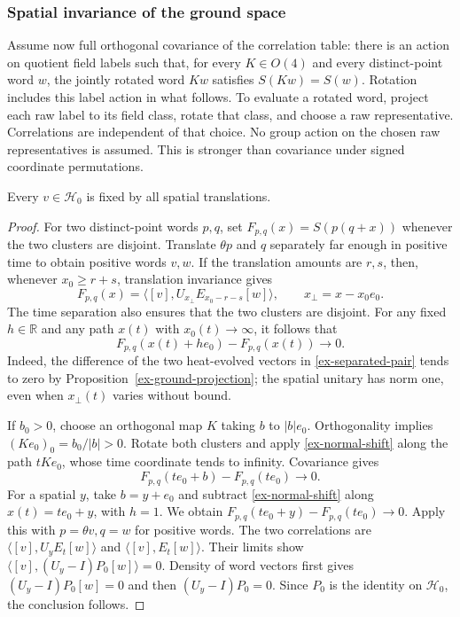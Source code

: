 \subsubsection{Spatial invariance of the ground space}
Assume now full orthogonal covariance of the correlation table: there is
an action on quotient field labels such that, for every \(K\in O(4)\) and every
distinct-point word \(w\), the jointly rotated word \(Kw\) satisfies
\(S(Kw)=S(w)\). Rotation includes this label action in what follows. To evaluate a rotated word, project each raw label to its field class, rotate that class, and choose a raw representative. Correlations are independent of that choice. No group action on the chosen raw representatives is assumed.
This is stronger than covariance under signed coordinate permutations.

\begin{lemma}\label{ex-ground-spatial}
Every \(v\in\mathcal H_0\) is fixed by all spatial translations.
\end{lemma}
\begin{proof}
For two distinct-point words \(p,q\), set
\(F_{p,q}(x)=S(p(q+x))\) whenever the two clusters are disjoint.
Translate \(\theta p\) and \(q\) separately far enough in positive
time to obtain positive words \(v,w\). If the translation amounts are
\(r,s\), then, whenever \(x_0\ge r+s\), translation invariance gives
\begin{equation}\label{ex-separated-pair}
 F_{p,q}(x)=\langle[v],U_{x_\perp}E_{x_0-r-s}[w]\rangle,
 \qquad x_\perp=x-x_0e_0.
\end{equation}
The time separation also ensures that the two clusters are disjoint.
For any fixed \(h\in\mathbb R\) and any path \(x(t)\) with
\(x_0(t)\to\infty\), it follows that
\begin{equation}\label{ex-normal-shift}
 F_{p,q}(x(t)+he_0)-F_{p,q}(x(t))\longrightarrow0.
\end{equation}
Indeed, the difference of the two heat-evolved vectors in
\eqref{ex-separated-pair} tends to zero by
Proposition~\ref{ex-ground-projection}; the spatial unitary has norm one,
even when \(x_\perp(t)\) varies without bound.

If \(b_0>0\), choose an orthogonal map \(K\) taking
\(b\) to \(|b|e_0\). Orthogonality implies
\((Ke_0)_0=b_0/|b|>0\). Rotate both clusters and apply
\eqref{ex-normal-shift} along the path \(tKe_0\), whose time
coordinate tends to infinity. Covariance gives
\[
 F_{p,q}(te_0+b)-F_{p,q}(te_0)\longrightarrow0.
\]
For a spatial \(y\), take \(b=y+e_0\) and subtract
\eqref{ex-normal-shift} along \(x(t)=te_0+y\), with \(h=1\).
We obtain \(F_{p,q}(te_0+y)-F_{p,q}(te_0)\to0\).
Apply this with \(p=\theta v,q=w\) for positive words. The two
correlations are \(\langle[v],U_yE_t[w]\rangle\) and
\(\langle[v],E_t[w]\rangle\). Their limits show
\(\langle[v],(U_y-I)P_0[w]\rangle=0\).
Density of word vectors first gives \((U_y-I)P_0[w]=0\) and then
\((U_y-I)P_0=0\). Since \(P_0\) is the identity on \(\mathcal H_0\),
the conclusion follows.
\end{proof}

